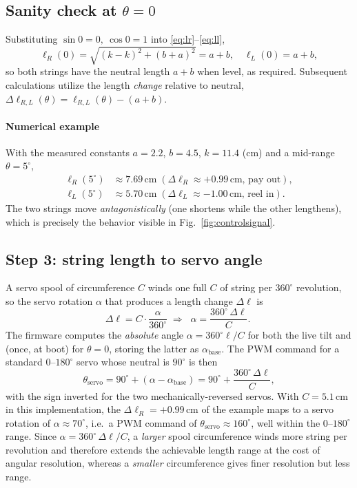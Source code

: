 \documentclass[conference]{IEEEtran}
\begin{document}
\subsection{Sanity check at $\theta=0$}
Substituting $\sin0=0,\ \cos0=1$ into \eqref{eq:lr}--\eqref{eq:ll},
\begin{equation}
  \ell_R(0)=\sqrt{(k-k)^2+(b+a)^2}=a+b,\quad \ell_L(0)=a+b,
\end{equation}
so both strings have the neutral length $a+b$ when level, as required. Subsequent calculations
utilize the length \emph{change} relative to neutral,
$\Delta\ell_{R,L}(\theta) = \ell_{R,L}(\theta) - (a+b)$.

\paragraph{Numerical example} With the measured constants
\mbox{$a=2.2$}, $b=4.5$, $k=11.4$ (cm) and a mid-range $\theta=5^\circ$,
\begin{align*}
  \ell_R(5^\circ) & \approx 7.69\,\text{cm}\;(\Delta\ell_R\approx+0.99\,\text{cm, pay out}), \\
  \ell_L(5^\circ) & \approx 5.70\,\text{cm}\;(\Delta\ell_L\approx-1.00\,\text{cm, reel in}).
\end{align*}
The two strings move \emph{antagonistically} (one shortens while the other
lengthens), which is precisely the behavior visible in
Fig.~\ref{fig:controlsignal}.

\subsection{Step 3: string length to servo angle}
A servo spool of circumference $C$ winds one full $C$ of string per $360^\circ$
revolution, so the servo rotation $\alpha$ that produces a length change
$\Delta\ell$ is
\begin{equation}
  \Delta\ell = C\cdot\frac{\alpha}{360^\circ}
  \;\Longrightarrow\;
  \boxed{\;\alpha=\frac{360^\circ\,\Delta\ell}{C}.\;}
  \label{eq:alpha}
\end{equation}
The firmware computes the \emph{absolute} angle $\alpha=360^\circ\ell/C$ for both
the live tilt and (once, at boot) for $\theta=0$, storing the latter as
$\alpha_\text{base}$. The PWM command for a standard $0$--$180^\circ$ servo whose
neutral is $90^\circ$ is then
\begin{equation}
  \theta_\text{servo} = 90^\circ + (\alpha - \alpha_\text{base})
  = 90^\circ + \frac{360^\circ\,\Delta\ell}{C},
\end{equation}
with the sign inverted for the two mechanically-reversed servos. With $C=5.1$\,cm
in this implementation, the $\Delta\ell_R=+0.99$\,cm of the example maps to a servo
rotation of $\alpha\approx70^\circ$, i.e.\ a PWM command of
$\theta_\text{servo}\approx160^\circ$, well within the $0$--$180^\circ$ range.
Since $\alpha=360^\circ\,\Delta\ell/C$, a
\emph{larger} spool circumference winds more string per revolution and therefore
extends the achievable length range at the cost of angular resolution, whereas a
\emph{smaller} circumference gives finer resolution but less range.
\end{document}
